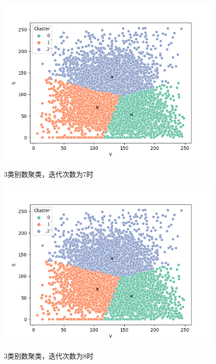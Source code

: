 \documentclass[UTF8]{ctexart}
\begin{document}
	\begin{figure}[htbp]
	\centering
	\caption{3类别数聚类，迭代次数为7时}
	\includegraphics[width=1.0\textwidth]{cluster7.png}
	\label{Fig.41}
	\end{figure}

	\begin{figure}[htbp]
	\centering
	\caption{3类别数聚类，迭代次数为8时}
	\includegraphics[width=1.0\textwidth]{cluster8.png}
	\label{Fig.42}
	\end{figure}
\end{document}
